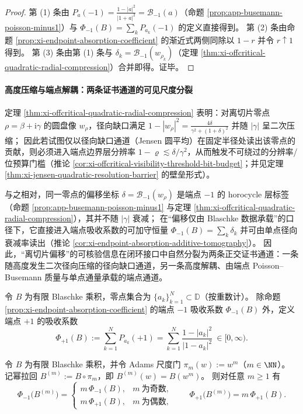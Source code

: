 \begin{proof}
第 (1) 条由 \(P_{a}(-1)=\frac{1-|a|^2}{|1+a|^2}=\mathcal{B}_{-1}(a)\)（命题 \ref{prop:app-busemann-poisson-minus1}）与 \(\Phi_{-1}(B)=\sum_k P_{a_k}(-1)\) 的定义直接得到。
第 (2) 条由命题 \ref{prop:xi-endpoint-absorption-coefficient} 的渐近式两侧同除以 \(1-r\) 并令 \(r\uparrow 1\) 得到。
第 (3) 条由第 (1) 条与 \(\delta_k=\mathcal{B}_{-1}(w_{\rho_k})\)（定理 \ref{thm:xi-offcritical-quadratic-radial-compression}）合并即得。证毕。
\end{proof}

\paragraph{高度压缩与端点解耦：两条证书通道的可见尺度分裂}
定理 \ref{thm:xi-offcritical-quadratic-radial-compression} 表明：对离切片零点 \(\rho=\beta+\mathrm{i}\gamma\) 的圆盘像 \(w_\rho\)，径向缺口满足
\(
1-|w_\rho|^2=\frac{4\delta}{\gamma^2+(1+\delta)^2}
\)
并随 \(|\gamma|\) 呈二次压缩；
因此若试图仅以径向缺口通道（Jensen 圆平均）在固定半径处读出该零点的贡献，则必须进入端点边界层分辨率 \(1-\varrho\lesssim \delta/\gamma^2\)，从而触发不可绕过的分辨率/位预算门槛（推论 \ref{cor:xi-offcritical-visibility-threshold-bit-budget}；并见定理 \ref{thm:xi-jensen-quadratic-resolution-barrier} 的壁垒形式）。
\par
与之相对，同一零点的偏移坐标 \(\delta=\mathcal{B}_{-1}(w_\rho)\) 是端点 \(-1\) 的 horocycle 层标签（命题 \ref{prop:app-busemann-poisson-minus1} 与定理 \ref{thm:xi-offcritical-quadratic-radial-compression}），其并不随 \(|\gamma|\) 衰减；
在“偏移仅由 Blaschke 数据承载”的口径下，它直接进入端点吸收系数的可加守恒量 \(\Phi_{-1}(B)=\sum_k \delta_k\) 并可由单点径向衰减率读出（推论 \ref{cor:xi-endpoint-absorption-additive-tomography}）。
因此，“离切片偏移”的可核验信息在闭环接口中自然分裂为两条正交证书通道：一条随高度发生二次径向压缩的径向缺口通道，另一条高度解耦、由端点 Poisson--Busemann 质量与单点通量承载的端点通道。

\begin{definition}[两端点吸收系数]\label{def:xi-endpoint-two-absorption-coefficients}
令 \(B\) 为有限 Blaschke 乘积，零点集合为 \(\{a_k\}_{k=1}^{N}\subset\mathbb{D}\)（按重数计）。
除命题 \ref{prop:xi-endpoint-absorption-coefficient} 的端点 \(-1\) 吸收系数 \(\Phi_{-1}(B)\) 外，定义端点 \(+1\) 的吸收系数
\[
\Phi_{+1}(B):=\sum_{k=1}^{N}P_{a_k}(+1)=\sum_{k=1}^{N}\frac{1-|a_k|^2}{|1-a_k|^2}\ \in[0,\infty).
\]
\end{definition}

\begin{theorem}\label{thm:xi-endpoint-absorption-adams-rescaling}
令 \(B\) 为有限 Blaschke 乘积，并令 Adams 尺度门 \(\pi_m(w):=w^m\)（\(m\in\NN\)）。
记幂拉回 \(B^{(m)}:=B\circ\pi_m\)，即 \(B^{(m)}(w)=B(w^m)\)。
则对任意 \(m\ge 1\) 有
\[
\boxed{\;
\Phi_{-1}\bigl(B^{(m)}\bigr)=
\begin{cases}
m\,\Phi_{-1}(B),& m\ \text{为奇数},\\[2pt]
m\,\Phi_{+1}(B),& m\ \text{为偶数},
\end{cases}
\qquad
\Phi_{+1}\bigl(B^{(m)}\bigr)=m\,\Phi_{+1}(B).\;}
\]
\end{theorem}

